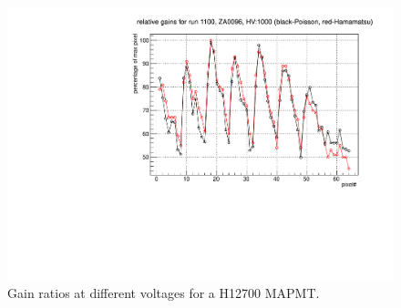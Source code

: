 \documentclass[prc,twocolumn]{revtex4}
\begin{document}
	\begin{figure}
		\includegraphics[width=1.0\linewidth,page=7]{hamamatsu.pdf}
		\caption{Gain ratios at different voltages for a H12700 MAPMT.}
		\label{hv}
	\end{figure}
\end{document}
